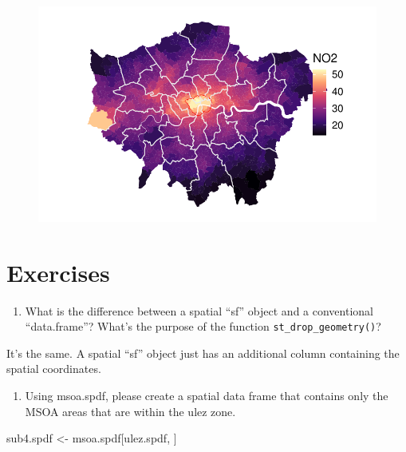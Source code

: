 \documentclass[
  letterpaper,
]{scrbook}
\newenvironment{Shaded}{\begin{snugshade}}{\end{snugshade}}
\newcommand{\NormalTok}[1]{\textcolor[rgb]{0.00,0.23,0.31}{#1}}
\newcommand{\OtherTok}[1]{\textcolor[rgb]{0.00,0.23,0.31}{#1}}
\providecommand{\tightlist}{%
  \setlength{\itemsep}{0pt}\setlength{\parskip}{0pt}}\usepackage{longtable,booktabs,array}
\begin{document}
\begin{figure}[H]

{\centering \includegraphics{02_spatial-data_files/figure-pdf/unnamed-chunk-23-1.pdf}

}

\end{figure}

\hypertarget{exercises}{%
\section{Exercises}\label{exercises}}

\begin{enumerate}
\def\labelenumi{\arabic{enumi})}
\tightlist
\item
  What is the difference between a spatial ``sf'' object and a
  conventional ``data.frame''? What's the purpose of the function
  \texttt{st\_drop\_geometry()}?
\end{enumerate}

It's the same. A spatial ``sf'' object just has an additional column
containing the spatial coordinates.

\begin{enumerate}
\def\labelenumi{\arabic{enumi})}
\setcounter{enumi}{1}
\tightlist
\item
  Using msoa.spdf, please create a spatial data frame that contains only
  the MSOA areas that are within the ulez zone.
\end{enumerate}

\begin{Shaded}
\begin{Highlighting}[]
\NormalTok{sub4.spdf }\OtherTok{\textless{}{-}}\NormalTok{ msoa.spdf[ulez.spdf, ]}
\end{Highlighting}
\end{Shaded}
\end{document}
